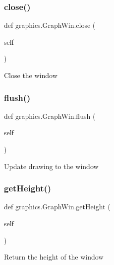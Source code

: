 \subsubsection{\texorpdfstring{close()}{close()}}
{\footnotesize\ttfamily def graphics.\+Graph\+Win.\+close (\begin{DoxyParamCaption}\item[{}]{self }\end{DoxyParamCaption})}

\begin{DoxyVerb}Close the window\end{DoxyVerb}
 \mbox{\label{classgraphics_1_1_graph_win_a232137e7f2464c4ed6fa4a6fd5022196}} 
\subsubsection{\texorpdfstring{flush()}{flush()}}
{\footnotesize\ttfamily def graphics.\+Graph\+Win.\+flush (\begin{DoxyParamCaption}\item[{}]{self }\end{DoxyParamCaption})}

\begin{DoxyVerb}Update drawing to the window\end{DoxyVerb}
 \mbox{\label{classgraphics_1_1_graph_win_a100d08973109234fa8b17ccc0ac3ff89}} 
\subsubsection{\texorpdfstring{get\+Height()}{getHeight()}}
{\footnotesize\ttfamily def graphics.\+Graph\+Win.\+get\+Height (\begin{DoxyParamCaption}\item[{}]{self }\end{DoxyParamCaption})}

\begin{DoxyVerb}Return the height of the window\end{DoxyVerb}
 \mbox{\label{classgraphics_1_1_graph_win_adf821f120ef3baf805a4945b009b4903}} 
